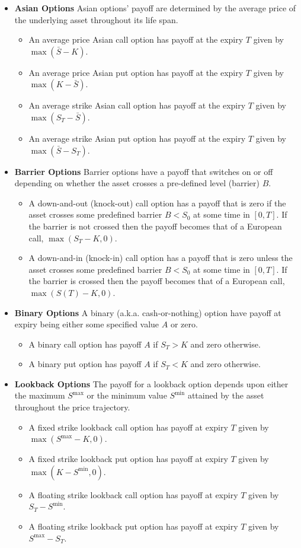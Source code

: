 \begin{itemize} \label{lst:exotic_options}
    \item \textbf{Asian Options} Asian options' payoff are determined by the average price of the underlying asset throughout its life span.
    \begin{itemize}
		\item An average price Asian call option has payoff at the expiry $T$ given by $\max(\bar{S} - K)$.
		\item An average price Asian put option has payoff at the expiry $T$ given by $\max(K - \bar{S})$.
		\item An average strike Asian call option has payoff at the expiry $T$ given by $\max(S_T - \bar{S})$.
		\item An average strike Asian put option has payoff at the expiry $T$ given by $\max(\bar{S} - S_T)$.
	\end{itemize}
    \item \textbf{Barrier Options} Barrier options have a payoff that switches on or off depending on whether the asset crosses a pre-defined level (barrier) $B$.
    \begin{itemize}
		\item A down-and-out (knock-out) call option has a payoff that is zero if the asset crosses some predefined barrier $B<S_0$ at some time in $[0, T]$. If the barrier is not crossed then the payoff becomes that of a European call, $\max(S_T - K, 0)$.
		\item A down-and-in (knock-in) call option has a payoff that is zero unless the asset crosses some predefined barrier $B<S_0$ at some time in $[0, T]$. If the barrier is crossed then the payoff becomes that of a European call, $\max(S(T) - K, 0)$.
    \end{itemize}
    \item \textbf{Binary Options} A binary (a.k.a. cash-or-nothing) option have payoff at expiry being either some specified value $A$ or zero.
    \begin{itemize}
		\item A binary call option has payoff $A$ if $S_T>K$ and zero otherwise.
		\item A binary put option has payoff $A$ if $S_T<K$ and zero otherwise.
	\end{itemize}
    \item \textbf{Lookback Options} The payoff for a lookback option depends upon either the maximum $S^{\max}$ or the minimum value $S^{\min}$ attained by the asset throughout the price trajectory.
    \begin{itemize}
		\item A fixed strike lookback call option has payoff at expiry $T$ given by $\max(S^{\max}-K, 0)$.
		\item A fixed strike lookback put option has payoff at expiry $T$ given by $\max(K-S^{\min}, 0)$.
		\item A floating strike lookback call option has payoff at expiry $T$ given by $S_T -S^{\min}$.
		\item A floating strike lookback put option has payoff at expiry $T$ given by $S^{\max} -S_T$.
    \end{itemize}
\end{itemize}


